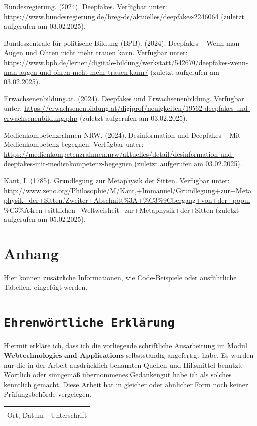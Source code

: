 \documentclass[a4paper,12pt]{article}
\begin{document}
\begin{thebibliography}{99}
     Bundesregierung. (2024). Deepfakes. 
    Verfügbar unter: \url{https://www.bundesregierung.de/breg-de/aktuelles/deepfakes-2246064} (zuletzt aufgerufen am 03.02.2025).
    
     Bundeszentrale für politische Bildung (BPB). (2024). Deepfakes – Wenn man Augen und Ohren nicht mehr trauen kann. 
    Verfügbar unter: \url{https://www.bpb.de/lernen/digitale-bildung/werkstatt/542670/deepfakes-wenn-man-augen-und-ohren-nicht-mehr-trauen-kann/} (zuletzt aufgerufen am 03.02.2025).
    
     Erwachsenenbildung.at. (2024). Deepfakes und Erwachsenenbildung. 
    Verfügbar unter: \url{https://erwachsenenbildung.at/digiprof/neuigkeiten/19562-deepfakes-und-erwachsenenbildung.php} (zuletzt aufgerufen am 03.02.2025).
    
     Medienkompetenzrahmen NRW. (2024). Desinformation und Deepfakes – Mit Medienkompetenz begegnen. 
    Verfügbar unter: \url{https://medienkompetenzrahmen.nrw/aktuelles/detail/desinformation-und-deepfakes-mit-medienkompetenz-begegnen} (zuletzt aufgerufen am 03.02.2025).
    
     Kant, I. (1785). Grundlegung zur Metaphysik der Sitten.  
    Verfügbar unter: \url{http://www.zeno.org/Philosophie/M/Kant,+Immanuel/Grundlegung+zur+Metaphysik+der+Sitten/Zweiter+Abschnitt%3A+%C3%9Cbergang+von+der+popul%C3%A4ren+sittlichen+Weltweisheit+zur+Metaphysik+der+Sitten} (zuletzt aufgerufen am 05.02.2025).  

\end{thebibliography}
\newpage
\appendix
\section{Anhang}
Hier können zusätzliche Informationen, wie Code-Beispiele oder ausführliche Tabellen, eingefügt werden.

\newpage
{}
\section*{\texttt{Ehrenwörtliche Erklärung}}
Hiermit erkläre ich, dass ich die vorliegende schriftliche Ausarbeitung im Modul \textbf{Webtechnologies and Applications} selbstständig
angefertigt habe. Es wurden nur die in der Arbeit ausdrücklich benannten Quellen und
Hilfsmittel benutzt. Wörtlich oder sinngemäß übernommenes Gedankengut habe ich als
solches kenntlich gemacht. Diese Arbeit hat in gleicher oder ähnlicher Form noch keiner
Prüfungsbehörde vorgelegen.

\vspace{3cm}
\noindent\begin{tabular}{p{}p{}}
    \hrulefill & \hrulefill \\
    Ort, Datum & Unterschrift \\
\end{tabular}
\end{document}
